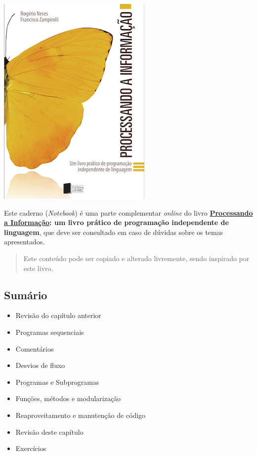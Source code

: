 \documentclass[12pt,a4paper]{article}
\providecommand{\tightlist}{%
      \setlength{\itemsep}{0pt}\setlength{\parskip}{0pt}}
\begin{document}
    \includegraphics{"figs/Capa_Processando_Informacao.jpg"}

Este caderno (\emph{Notebook}) é uma parte complementar \emph{online} do
livro
\textbf{\href{https://editora.ufabc.edu.br/matematica-e-ciencias-da-computacao/58-processando-a-informacao}{Processando
a Informação}: um livro prático de programação independente de
linguagem}, que deve ser consultado em caso de dúvidas sobre os temas
apresentados.

\begin{quote}
Este conteúdo pode ser copiado e alterado livremente, sendo inspirado
por este livro.
\end{quote}

    \hypertarget{sumuxe1rio}{%
\subsection{Sumário}\label{sumuxe1rio}}

\begin{itemize}
\tightlist
\item
  Revisão do capítulo anterior
\item
  Programas sequenciais
\item
  Comentários
\item
  Desvios de fluxo
\item
  Programas e Subprogramas
\item
  Funções, métodos e modularização
\item
  Reaproveitamento e manutenção de código
\item
  Revisão deste capítulo
\item
  Exercícios
\end{itemize}
\end{document}
